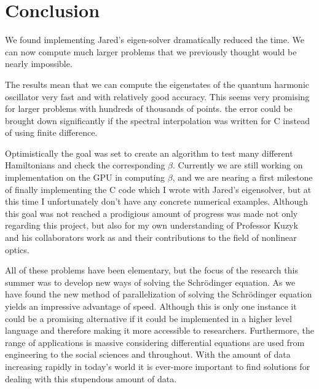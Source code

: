 \documentclass{report}
\theoremstyle{definition}
\begin{document}
\section*{Conclusion}
We found implementing Jared's eigen-solver dramatically reduced the time. We can now compute much larger problems that we previously thought would be nearly impossible. 


The results mean that we can compute the eigenstates of the quantum harmonic oscillator very fast and with relatively good accuracy. This seems very promising for larger problems with hundreds of thousands of points. the error could be brought down significantly if the spectral interpolation was written for C instead of using finite difference. 



Optimistically the goal was set to create an algorithm to test many different Hamiltonians and check the corresponding $\beta$. Currently we are still working on implementation on the GPU in computing $\beta$, and we are nearing a first milestone of finally implementing the C code which I wrote with Jared's eigensolver, but at this time I unfortunately don't have any concrete numerical examples. Although this goal was not reached a prodigious amount of progress was made not only regarding this project, but also for my own understanding of Professor Kuzyk and his collaborators work as and their contributions to the field of nonlinear optics. 

All of these problems have been elementary, but the focus of the research this summer was to develop new ways of solving the Schr\"odinger equation. As we have found the new method of parallelization of solving the Schr\"odinger equation yields an impressive advantage of speed. Although this is only one instance it could be a promising alternative if it could be implemented in a higher level language and therefore making it more accessible to researchers. Furthermore, the range of applications is massive considering differential equations are used from engineering to the social sciences and throughout. With the amount of data increasing rapidly in today's world it is ever-more important to find solutions for dealing with this stupendous amount of data. 













\end{document}
